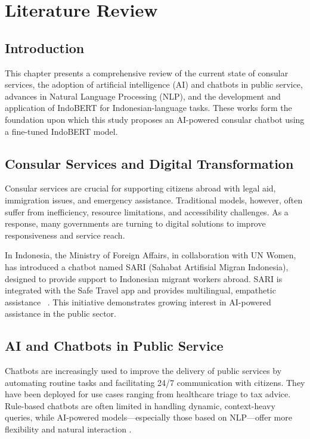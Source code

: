 \documentclass[a4paper,12pt]{report}
\begin{document}

\newpage

\chapter{Literature Review}
\section{Introduction}
This chapter presents a comprehensive review of the current state of consular services, the adoption of artificial intelligence (AI) and chatbots in public service, advances in Natural Language Processing (NLP), and the development and application of IndoBERT for Indonesian-language tasks. These works form the foundation upon which this study proposes an AI-powered consular chatbot using a fine-tuned IndoBERT model.

\section{Consular Services and Digital Transformation}
Consular services are crucial for supporting citizens abroad with legal aid, immigration issues, and emergency assistance. Traditional models, however, often suffer from inefficiency, resource limitations, and accessibility challenges. As a response, many governments are turning to digital solutions to improve responsiveness and service reach.

In Indonesia, the Ministry of Foreign Affairs, in collaboration with UN Women, has introduced a chatbot named SARI (Sahabat Artifisial Migran Indonesia), designed to provide support to Indonesian migrant workers abroad. SARI is integrated with the Safe Travel app and provides multilingual, empathetic assistance ~\cite{unwomen2024}. This initiative demonstrates growing interest in AI-powered assistance in the public sector.

\section{AI and Chatbots in Public Service}
Chatbots are increasingly used to improve the delivery of public services by automating routine tasks and facilitating 24/7 communication with citizens. They have been deployed for use cases ranging from healthcare triage to tax advice. Rule-based chatbots are often limited in handling dynamic, context-heavy queries, while AI-powered models—especially those based on NLP—offer more flexibility and natural interaction \cite{amiri2022}.
\end{document}
